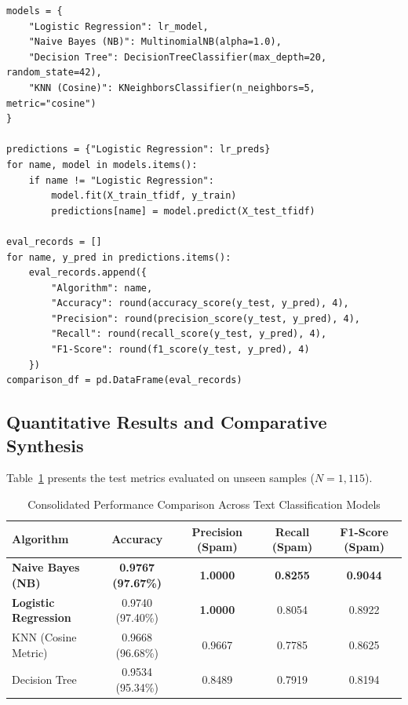 \documentclass[12pt]{article}
\begin{document}
\begin{lstlisting}[style=code]
models = {
    "Logistic Regression": lr_model,
    "Naive Bayes (NB)": MultinomialNB(alpha=1.0),
    "Decision Tree": DecisionTreeClassifier(max_depth=20, random_state=42),
    "KNN (Cosine)": KNeighborsClassifier(n_neighbors=5, metric="cosine")
}

predictions = {"Logistic Regression": lr_preds}
for name, model in models.items():
    if name != "Logistic Regression":
        model.fit(X_train_tfidf, y_train)
        predictions[name] = model.predict(X_test_tfidf)

eval_records = []
for name, y_pred in predictions.items():
    eval_records.append({
        "Algorithm": name,
        "Accuracy": round(accuracy_score(y_test, y_pred), 4),
        "Precision": round(precision_score(y_test, y_pred), 4),
        "Recall": round(recall_score(y_test, y_pred), 4),
        "F1-Score": round(f1_score(y_test, y_pred), 4)
    })
comparison_df = pd.DataFrame(eval_records)
\end{lstlisting}

\subsection{Quantitative Results and Comparative Synthesis}
Table~\ref{tab:comparison_summary} presents the test metrics evaluated on unseen samples ($N=1,115$).

\begin{table}[H]
\centering
\caption{Consolidated Performance Comparison Across Text Classification Models}
\label{tab:comparison_summary}
\vspace{0.2cm}
\begin{tabular}{lcccc}
\toprule
\textbf{Algorithm} & \textbf{Accuracy} & \textbf{Precision (Spam)} & \textbf{Recall (Spam)} & \textbf{F1-Score (Spam)} \\
\midrule
\textbf{Naive Bayes (NB)}    & \textbf{0.9767 (97.67\%)} & \textbf{1.0000} & \textbf{0.8255} & \textbf{0.9044} \\
\textbf{Logistic Regression} & 0.9740 (97.40\%)          & \textbf{1.0000} & 0.8054          & 0.8922          \\
KNN (Cosine Metric)          & 0.9668 (96.68\%)          & 0.9667          & 0.7785          & 0.8625          \\
Decision Tree                & 0.9534 (95.34\%)          & 0.8489          & 0.7919          & 0.8194          \\
\bottomrule
\end{tabular}
\end{table}
\end{document}
